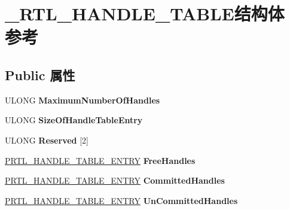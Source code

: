\hypertarget{struct___r_t_l___h_a_n_d_l_e___t_a_b_l_e}{}\section{\+\_\+\+R\+T\+L\+\_\+\+H\+A\+N\+D\+L\+E\+\_\+\+T\+A\+B\+L\+E结构体 参考}
\label{struct___r_t_l___h_a_n_d_l_e___t_a_b_l_e}
\subsection*{Public 属性}
\begin{DoxyCompactItemize}
\item 
\mbox{\label{struct___r_t_l___h_a_n_d_l_e___t_a_b_l_e_a99410bd0928b37db01dcc29b7dc67a22}} 
U\+L\+O\+NG {\bfseries Maximum\+Number\+Of\+Handles}
\item 
\mbox{\label{struct___r_t_l___h_a_n_d_l_e___t_a_b_l_e_aca6c427e1052155ed102f94c532af7f2}} 
U\+L\+O\+NG {\bfseries Size\+Of\+Handle\+Table\+Entry}
\item 
\mbox{\label{struct___r_t_l___h_a_n_d_l_e___t_a_b_l_e_a902e38afe21cf5c174a60a070cf330b9}} 
U\+L\+O\+NG {\bfseries Reserved} \mbox{[}2\mbox{]}
\item 
\mbox{\label{struct___r_t_l___h_a_n_d_l_e___t_a_b_l_e_a2fe78ff3303bf790fea970a827902d3d}} 
\hyperlink{struct___r_t_l___h_a_n_d_l_e___t_a_b_l_e___e_n_t_r_y}{P\+R\+T\+L\+\_\+\+H\+A\+N\+D\+L\+E\+\_\+\+T\+A\+B\+L\+E\+\_\+\+E\+N\+T\+RY} {\bfseries Free\+Handles}
\item 
\mbox{\label{struct___r_t_l___h_a_n_d_l_e___t_a_b_l_e_a8a9d69a1c8b39a1b5b02344830a9aa13}} 
\hyperlink{struct___r_t_l___h_a_n_d_l_e___t_a_b_l_e___e_n_t_r_y}{P\+R\+T\+L\+\_\+\+H\+A\+N\+D\+L\+E\+\_\+\+T\+A\+B\+L\+E\+\_\+\+E\+N\+T\+RY} {\bfseries Committed\+Handles}
\item 
\mbox{\label{struct___r_t_l___h_a_n_d_l_e___t_a_b_l_e_a22b11c6c50863e6547ee76c51d0290ad}} 
\hyperlink{struct___r_t_l___h_a_n_d_l_e___t_a_b_l_e___e_n_t_r_y}{P\+R\+T\+L\+\_\+\+H\+A\+N\+D\+L\+E\+\_\+\+T\+A\+B\+L\+E\+\_\+\+E\+N\+T\+RY} {\bfseries Un\+Committed\+Handles}

\end{DoxyCompactItemize}

